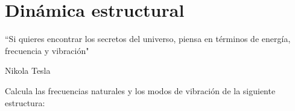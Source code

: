 \chapter{Dinámica estructural}


\begin{kaobox}
	``Si quieres encontrar los secretos del universo, piensa en términos de energía, frecuencia y vibración"
	\begin{flushright}
		Nikola Tesla
	\end{flushright}
\end{kaobox}


\begin{example}
	Calcula las frecuencias naturales y los modos de vibración de la siguiente estructura:
\end{example}
